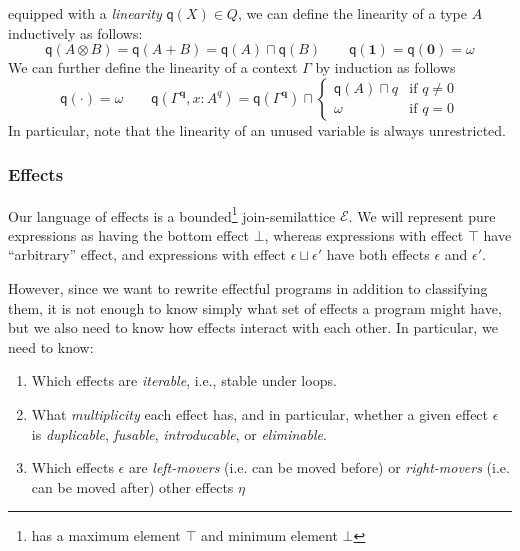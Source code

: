 \documentclass[acmsmall,screen,review]{acmart}
\newcommand{\mc}[1]{\ensuremath{\mathcal{#1}}}
\newcommand{\mb}[1]{\ensuremath{\mathbf{#1}}}
\newcommand{\ms}[1]{\ensuremath{\mathsf{#1}}}
\newcommand{\topq}{\omega}
\newcommand{\alquant}{\ms{q}}
\begin{document}
equipped with a \emph{linearity} $\alquant(X) \in Q$, we can define the linearity of a type $A$
inductively as follows:
\begin{equation}
  \alquant(A \otimes B) = \alquant(A + B) = \alquant(A) \sqcap \alquant(B) \qquad
  \alquant(\mb{1}) = \alquant(\mb{0}) = \topq
\end{equation}
We can further define the linearity of a context $\Gamma$ by induction as follows
\begin{equation}
  \alquant(\cdot) = \topq \qquad
  \alquant(\Gamma^{\mb{q}}, x : A^q) 
    = \alquant(\Gamma^{\mb{q}}) \sqcap \begin{cases}
    \alquant(A) \sqcap q & \text{if } q \neq 0 \\
    \topq & \text{if } q = 0
  \end{cases}
\end{equation}
In particular, note that the linearity of an unused variable is always unrestricted.
%

\subsubsection{Effects}
Our language of effects is a bounded\footnote{has a maximum element $\top$ and minimum element $\bot$} join-semilattice $\mc{E}$. We will represent pure expressions
as having the bottom effect $\bot$, whereas expressions with effect $\top$ have ``arbitrary''
effect, and expressions with effect $\epsilon \sqcup \epsilon'$
have both effects $\epsilon$ and $\epsilon'$.



However, since we want to rewrite effectful programs in addition to classifying them, it is not enough to know simply what set of effects a program might have, but we also need to know how effects interact with each
other. In particular, we need to know:
\begin{enumerate}
  \item Which effects are \emph{iterable}, i.e., stable under loops. %
  \item What \emph{multiplicity} each effect has, and in particular, whether a given effect
  $\epsilon$ is \emph{duplicable}, \emph{fusable}, \emph{introducable}, or \emph{eliminable}.
  \item Which effects $\epsilon$ are \emph{left-movers} (i.e. can be moved before) or
  \emph{right-movers} (i.e. can be moved after) other effects $\eta$
\end{enumerate}
\end{document}
